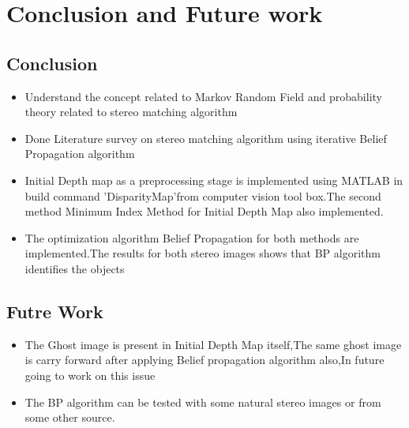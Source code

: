 \chapter{Conclusion and Future work}
\section{Conclusion}
\begin{itemize}
  \item Understand the concept related to Markov Random Field and probability theory related to stereo matching algorithm
  \item Done Literature survey on stereo matching algorithm using iterative Belief Propagation algorithm
 \item Initial Depth map as a preprocessing stage is implemented using MATLAB in build command 'DisparityMap'from computer vision tool box.The second method Minimum Index Method for Initial Depth Map also implemented.
 \item The optimization algorithm Belief Propagation for both methods are implemented.The results for both stereo images shows that BP algorithm identifies the objects
\end{itemize}
\section{Futre Work}
\begin{itemize}
  \item The Ghost image is present in Initial Depth Map itself,The same ghost image is carry forward after applying Belief propagation algorithm also,In future  going to work on this issue
  \item The BP algorithm  can be tested with some natural  stereo images or from some other source.
\end{itemize}



